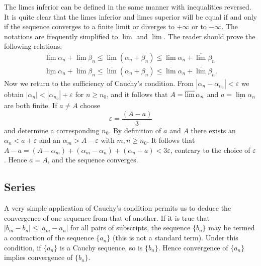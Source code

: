 The limes inferior can be defined in the same manner with inequalities reversed. It is quite clear that the limes inferior and limes superior will be equal if and only if the sequence converges to a finite limit or diverges to $+\infty$ or to $-\infty$. The notations are frequently simplified to $\overline{\lim}$ and $\underline{\lim}$. The reader should prove the following relations:
\begin{equation*}
\begin{array}{l} \underline {{\lim}} \alpha_ {n} + \underline {{\lim}} \beta_ {n} \leq \underline {{\lim}} (\alpha_ {n} + \beta_ {n}) \leq \underline {{\lim}} \alpha_ {n} + \overline {{\lim}} \beta_ {n} \\ \underline {{\lim}} \alpha_ {n} + \overline {{\lim}} \beta_ {n} \leq \overline {{\lim}} (\alpha_ {n} + \beta_ {n}) \leq \overline {{\lim}} \alpha_ {n} + \overline {{\lim}} \beta_ {n}. \end{array}
\end{equation*}
Now we return to the sufficiency of Cauchy's condition. From $|\alpha_n - \alpha_{n_0}| < \varepsilon$ we obtain $|\alpha_n| < |\alpha_{n_0}| + \varepsilon$ for $n \geq n_0$, and it follows that $A = \varlimsup \alpha_n$ and $a = \underline{\lim}\alpha_n$ are both finite. If $a \neq A$ choose
\begin{equation*}
\varepsilon = \frac {(A - a)}{3}
\end{equation*}
and determine a corresponding $n_0$. By definition of $a$ and $A$ there exists an $\alpha_n < a + \varepsilon$ and an $\alpha_m > A - \varepsilon$ with $m, n \geq n_0$. It follows that $A - a = (A - \alpha_m) + (\alpha_m - \alpha_n) + (\alpha_n - a) < 3\varepsilon$, contrary to the choice of $\varepsilon$. Hence $a = A$, and the sequence converges.


\setcounter{section}{2}\setcounter{subsection}{1}\subsection{Series}\label{sec:2.2.2}
A very simple application of Cauchy's condition permits us to deduce the convergence of one sequence from that of another. If it is true that $|b_m - b_n| \leq |a_m - a_n|$ for all pairs of subscripts, the sequence $\{b_n\}$ may be termed a contraction of the sequence $\{a_n\}$ (this is not a standard term). Under this condition, if $\{a_n\}$ is a Cauchy sequence, so is $\{b_n\}$. Hence convergence of $\{a_n\}$ implies convergence of $\{b_n\}$.

